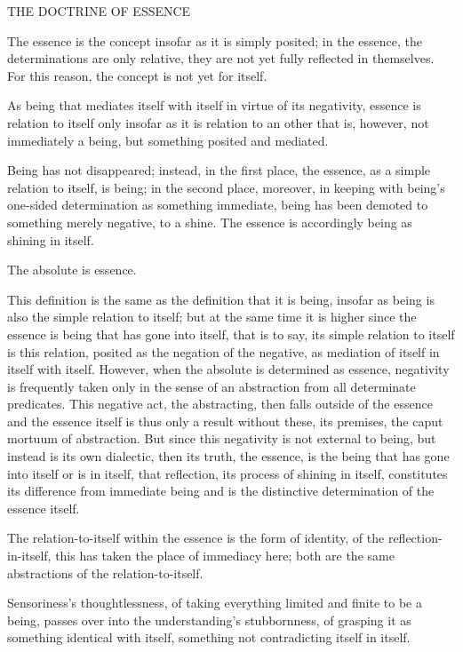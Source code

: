 THE DOCTRINE OF ESSENCE

The essence is the concept insofar as it is simply posited;
in the essence, the determinations are only relative,
they are not yet fully reflected in themselves.
For this reason, the concept is not yet for itself.

As being that mediates itself with itself in virtue of its negativity,
essence is relation to itself only insofar as
it is relation to an other that is, however, not immediately a being,
but something posited and mediated.

Being has not disappeared;
instead, in the first place,
the essence, as a simple relation to itself, is being;
in the second place, moreover,
in keeping with being's one-sided determination as something immediate,
being has been demoted to something merely negative, to a shine.
The essence is accordingly being as shining in itself.

    The absolute is essence.

    This definition is the same as the definition that it is being,
    insofar as being is also the simple relation to itself;
    but at the same time it is higher since the essence is
    being that has gone into itself, that is to say,
    its simple relation to itself is this relation,
    posited as the negation of the negative,
    as mediation of itself in itself with itself.
    However, when the absolute is determined as essence,
    negativity is frequently taken only in the sense of
    an abstraction from all determinate predicates.
    This negative act, the abstracting, then falls outside of the essence and
    the essence itself is thus only a result without these, its premises,
    the caput mortuum of abstraction.
    But since this negativity is not external to being,
    but instead is its own dialectic,
    then its truth, the essence,
    is the being that has gone into itself or is in itself,
    that reflection, its process of shining in itself, constitutes
    its difference from immediate being and
    is the distinctive determination of the essence itself.

The relation-to-itself within the essence is the form of identity,
of the reflection-in-itself, this has taken the place of immediacy here;
both are the same abstractions of the relation-to-itself.

    Sensoriness's thoughtlessness,
    of taking everything limited and finite to be a being,
    passes over into the understanding's stubbornness,
    of grasping it as something identical with itself,
    something not contradicting itself in itself.

